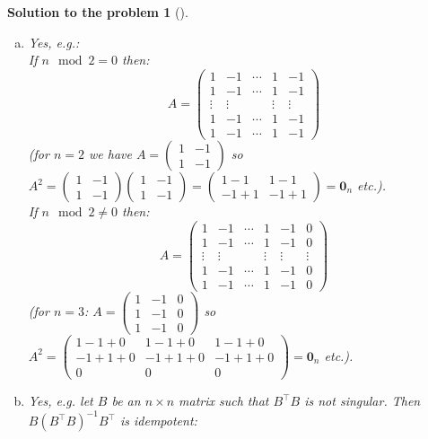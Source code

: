 \documentclass[12pt,a4]{article}
\newtheorem{solution}{Solution to the problem}
\begin{document}
\begin{solution}[]\rm \quad
	\begin{enumerate}[(a)]\rm
		\item Yes, e.g.:\\
		If $n \mod 2 = 0$ then:
		\[
		A = \begin{pmatrix}
		1 & -1 &\cdots & 1 & -1 \\ 
		1 & -1 &\cdots & 1 & -1  \\
		\vdots & \vdots &  & \vdots & \vdots \\
		1 & -1 &\cdots & 1 & -1  \\
		1 & -1 &\cdots & 1 & -1
		\end{pmatrix}
		\]
		(for $n=2$ we have $A = \begin{pmatrix}1 & -1 \\ 1 & -1\end{pmatrix}$ so $A^2 = \begin{pmatrix}1 & -1 \\ 1 & -1\end{pmatrix} \begin{pmatrix}1 & -1 \\ 1 & -1\end{pmatrix} = \begin{pmatrix}1-1 & 1-1 \\ -1+1 & -1+1\end{pmatrix} = \mathbf{0}_n$ etc.).\\[10pt]
		If $n \mod 2 \neq 0$ then:
		\[
		A = \begin{pmatrix}
		1 & -1 &\cdots & 1 & -1 & 0\\ 
		1 & -1 &\cdots & 1 & -1  & 0\\
		\vdots & \vdots & & \vdots & \vdots & \vdots \\
		1 & -1 &\cdots & 1 & -1 & 0 \\
		1 & -1 &\cdots & 1 & -1 & 0
		\end{pmatrix}
		\]
		(for $n=3$: $A = \begin{pmatrix}1 & -1 & 0\\ 1 & -1 & 0\\ 1 & -1 & 0\end{pmatrix}$ so $A^2 = \begin{pmatrix}1-1+0 & 1-1+0 & 1-1+0\\ -1+1+0 & -1+1+0 & -1+1+0\\ 0 & 0 & 0\end{pmatrix}=\mathbf{0}_n$ etc.).
		\item Yes, e.g. let $B$ be an $n\times n$ matrix such that $B^\top B$ is not singular. Then $B(B^\top B)^{-1}B^\top $ is idempotent:

\end{enumerate}
\end{solution}
\end{document}
